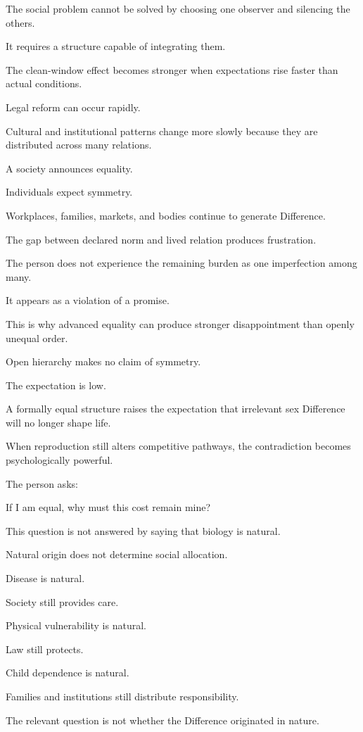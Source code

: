 The social problem cannot be solved by choosing one observer and silencing the others.

It requires a structure capable of integrating them.

The clean-window effect becomes stronger when expectations rise faster than actual conditions.

Legal reform can occur rapidly.

Cultural and institutional patterns change more slowly because they are distributed across many relations.

A society announces equality.

Individuals expect symmetry.

Workplaces, families, markets, and bodies continue to generate Difference.

The gap between declared norm and lived relation produces frustration.

The person does not experience the remaining burden as one imperfection among many.

It appears as a violation of a promise.

This is why advanced equality can produce stronger disappointment than openly unequal order.

Open hierarchy makes no claim of symmetry.

The expectation is low.

A formally equal structure raises the expectation that irrelevant sex Difference will no longer shape life.

When reproduction still alters competitive pathways, the contradiction becomes psychologically powerful.

The person asks:

If I am equal, why must this cost remain mine?

This question is not answered by saying that biology is natural.

Natural origin does not determine social allocation.

Disease is natural.

Society still provides care.

Physical vulnerability is natural.

Law still protects.

Child dependence is natural.

Families and institutions still distribute responsibility.

The relevant question is not whether the Difference originated in nature.

